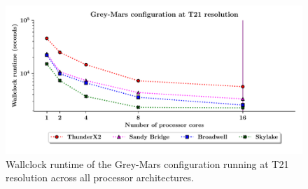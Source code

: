 \documentclass[a4paper,11pt]{report}
\begin{document}
\begin{figure}[htbp]
\begin{center}
\includegraphics[width=1\linewidth]{img/scaling_graph_T21_Grey_mars.pdf}
\caption[Wallclock runtime of the Grey-Mars configuration at T21 resolution]{Wallclock runtime of the Grey-Mars configuration running at T21 resolution across all processor architectures. }
\label{fig:t21-scale-grey}
\end{center}
\end{figure}
\newpage
\end{document}
